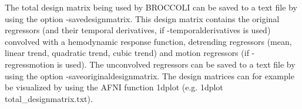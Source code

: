 The total design matrix being used by BROCCOLI can be saved to a text file by using the option -savedesignmatrix. This design matrix contains the original regressors (and their temporal derivatives, if -temporalderivatives is used) convolved with a hemodynamic response function, detrending regressors (mean, linear trend, quadratic trend, cubic trend) and motion regressors (if -regressmotion is used). The unconvolved regressors can be saved to a text file by using the option -saveoriginaldesignmatrix. The design matrices can for example be visualized by using the AFNI function 1dplot (e.g. 1dplot total\_designmatrix.txt).










